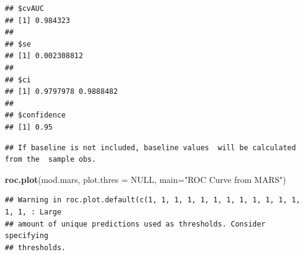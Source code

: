 \documentclass[
  11pt,
]{article}
\newenvironment{Shaded}{\begin{snugshade}}{\end{snugshade}}
\newcommand{\AttributeTok}[1]{\textcolor[rgb]{0.13,0.29,0.53}{#1}}
\newcommand{\ConstantTok}[1]{\textcolor[rgb]{0.56,0.35,0.01}{#1}}
\newcommand{\DecValTok}[1]{\textcolor[rgb]{0.00,0.00,0.81}{#1}}
\newcommand{\FloatTok}[1]{\textcolor[rgb]{0.00,0.00,0.81}{#1}}
\newcommand{\FunctionTok}[1]{\textcolor[rgb]{0.13,0.29,0.53}{\textbf{#1}}}
\newcommand{\NormalTok}[1]{#1}
\newcommand{\OtherTok}[1]{\textcolor[rgb]{0.56,0.35,0.01}{#1}}
\newcommand{\SpecialCharTok}[1]{\textcolor[rgb]{0.81,0.36,0.00}{\textbf{#1}}}
\newcommand{\StringTok}[1]{\textcolor[rgb]{0.31,0.60,0.02}{#1}}
\begin{document}
\begin{verbatim}
## $cvAUC
## [1] 0.984323
## 
## $se
## [1] 0.002308812
## 
## $ci
## [1] 0.9797978 0.9888482
## 
## $confidence
## [1] 0.95
\end{verbatim}

\begin{Shaded}
\end{Shaded}

\begin{verbatim}
## If baseline is not included, baseline values  will be calculated from the  sample obs.
\end{verbatim}

\begin{Shaded}
\begin{Highlighting}[]
\FunctionTok{roc.plot}\NormalTok{(mod.mars, }\AttributeTok{plot.thres =} \ConstantTok{NULL}\NormalTok{, }\AttributeTok{main=}\StringTok{"ROC Curve from MARS"}\NormalTok{)}
\end{Highlighting}
\end{Shaded}

\begin{verbatim}
## Warning in roc.plot.default(c(1, 1, 1, 1, 1, 1, 1, 1, 1, 1, 1, 1, 1, 1, : Large
## amount of unique predictions used as thresholds. Consider specifying
## thresholds.
\end{verbatim}

\begin{Shaded}
\end{Shaded}
\end{document}
